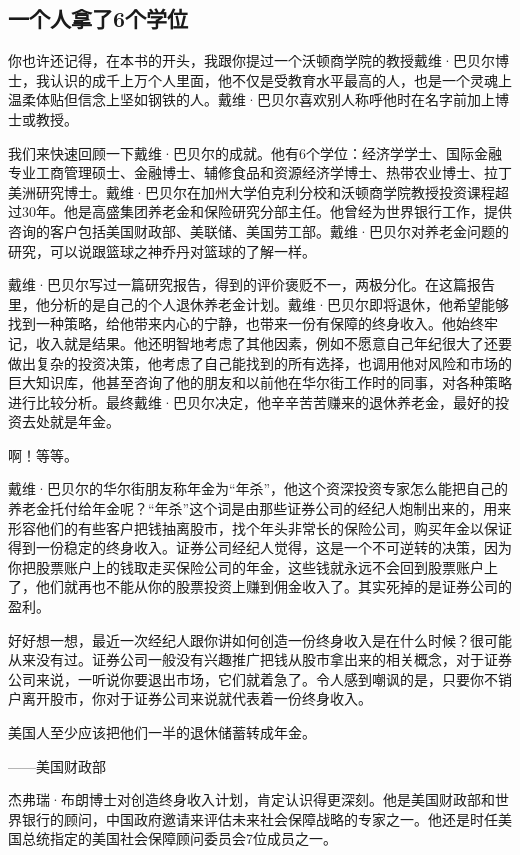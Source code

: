 \subsection{一个人拿了6个学位}

你也许还记得，在本书的开头，我跟你提过一个沃顿商学院的教授戴维·巴贝尔博士，我认识的成千上万个人里面，他不仅是受教育水平最高的人，也是一个灵魂上温柔体贴但信念上坚如钢铁的人。戴维·巴贝尔喜欢别人称呼他时在名字前加上博士或教授。

我们来快速回顾一下戴维·巴贝尔的成就。他有6个学位：经济学学士、国际金融专业工商管理硕士、金融博士、辅修食品和资源经济学博士、热带农业博士、拉丁美洲研究博士。戴维·巴贝尔在加州大学伯克利分校和沃顿商学院教授投资课程超过30年。他是高盛集团养老金和保险研究分部主任。他曾经为世界银行工作，提供咨询的客户包括美国财政部、美联储、美国劳工部。戴维·巴贝尔对养老金问题的研究，可以说跟篮球之神乔丹对篮球的了解一样。

戴维·巴贝尔写过一篇研究报告，得到的评价褒贬不一，两极分化。在这篇报告里，他分析的是自己的个人退休养老金计划。戴维·巴贝尔即将退休，他希望能够找到一种策略，给他带来内心的宁静，也带来一份有保障的终身收入。他始终牢记，收入就是结果。他还明智地考虑了其他因素，例如不愿意自己年纪很大了还要做出复杂的投资决策，他考虑了自己能找到的所有选择，也调用他对风险和市场的巨大知识库，他甚至咨询了他的朋友和以前他在华尔街工作时的同事，对各种策略进行比较分析。最终戴维·巴贝尔决定，他辛辛苦苦赚来的退休养老金，最好的投资去处就是年金。

啊！等等。

戴维·巴贝尔的华尔街朋友称年金为“年杀”，他这个资深投资专家怎么能把自己的养老金托付给年金呢？“年杀”这个词是由那些证券公司的经纪人炮制出来的，用来形容他们的有些客户把钱抽离股市，找个年头非常长的保险公司，购买年金以保证得到一份稳定的终身收入。证券公司经纪人觉得，这是一个不可逆转的决策，因为你把股票账户上的钱取走买保险公司的年金，这些钱就永远不会回到股票账户上了，他们就再也不能从你的股票投资上赚到佣金收入了。其实死掉的是证券公司的盈利。

好好想一想，最近一次经纪人跟你讲如何创造一份终身收入是在什么时候？很可能从来没有过。证券公司一般没有兴趣推广把钱从股市拿出来的相关概念，对于证券公司来说，一听说你要退出市场，它们就着急了。令人感到嘲讽的是，只要你不销户离开股市，你对于证券公司来说就代表着一份终身收入。

\begin{BookQuote}
美国人至少应该把他们一半的退休储蓄转成年金。

\hfill ——美国财政部
\end{BookQuote}

杰弗瑞·布朗博士对创造终身收入计划，肯定认识得更深刻。他是美国财政部和世界银行的顾问，中国政府邀请来评估未来社会保障战略的专家之一。他还是时任美国总统指定的美国社会保障顾问委员会7位成员之一。

